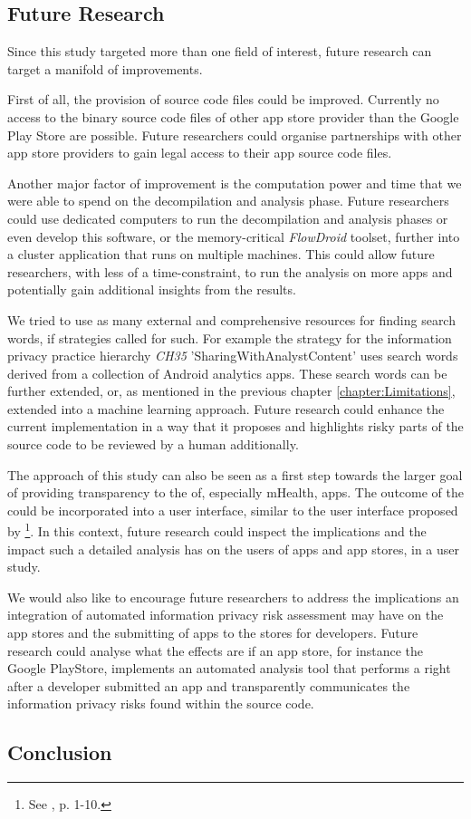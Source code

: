 \subsection{Future Research}

Since this study targeted more than one field of interest, future research can target a manifold of improvements.

First of all, the provision of source code files could be improved. 
Currently no access to the binary source code files of other app store provider than the Google Play Store are possible.
Future researchers could organise partnerships with other app store providers to gain legal access to their app source code files.

Another major factor of improvement is the computation power and time that we were able to spend on the decompilation and analysis phase.
Future researchers could use dedicated computers to run the decompilation and analysis phases or even develop this software, or the memory-critical \textit{FlowDroid} toolset, further into a cluster application that runs on multiple machines.
This could allow future researchers, with less of a time-constraint, to run the analysis on more apps and potentially gain additional insights from the results.

We tried to use as many external and comprehensive resources for finding search words, if strategies called for such.
For example the strategy for the information privacy practice hierarchy \textit{CH35} 'SharingWithAnalystContent' uses search words derived from a collection of Android analytics apps.
These search words can be further extended, or, as mentioned in the previous chapter \ref{chapter:Limitations}, extended into a machine learning approach. 
Future research could enhance the current implementation in a way that it proposes and highlights risky parts of the source code to be reviewed by a human additionally.

The approach of this study can also be seen as a first step towards the larger goal of providing transparency to the \ipr of, especially mHealth, apps.
The outcome of the \aiprat could be incorporated into a user interface, similar to the user interface proposed by \textcite{Bruggemann2016}\footnote{See \cite{Bruggemann2016}, p. 1-10.}.
In this context, future research could inspect the implications and the impact such a detailed \ipr analysis has on the users of apps and app stores, in a user study.

We would also like to encourage future researchers to address the implications an integration of automated information privacy risk assessment may have on the app stores and the submitting of apps to the stores for developers.
Future research could analyse what the effects are if an app store, for instance the Google PlayStore, implements an automated \ipr analysis tool that performs a \sca right after a developer submitted an app and transparently communicates the information privacy risks found within the source code.

\subsection{Conclusion}

